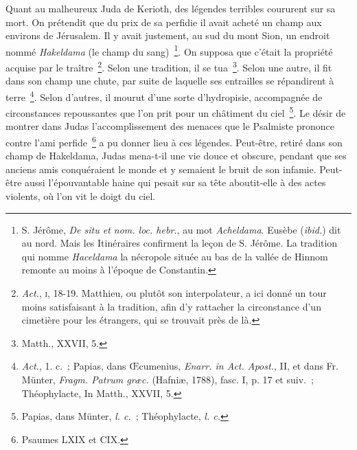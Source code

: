 \documentclass[french,twoside]{book} %
\begin{document}
Quant au malheureux Juda de Kerioth, des légendes terribles coururent sur sa mort. On prétendit que du prix de sa perfidie il avait acheté un champ aux environs de Jérusalem. Il y avait justement, au sud du mont Sion, un endroit nommé {\itshape Hakeldama} (le champ du sang) \footnote{ S. Jérôme, {\itshape De situ et nom. loc. hebr.}, au mot {\itshape Acheldama}. Eusèbe ({\itshape ibid.}) dit au nord. Mais les Itinéraires confirment la leçon de S. Jérôme. La tradition qui nomme {\itshape Haceldama} la nécropole située au bas de la vallée de Hinnom remonte au moins à l’époque de Constantin.}. On supposa que c’était la propriété acquise par le traître \footnote{{\itshape Act.}, \textsc{i}, 18-19. Matthieu, ou plutôt son interpolateur, a ici donné un tour moins satisfaisant à la tradition, afin d’y rattacher la circonstance d’un cimetière pour les étrangers, qui se trouvait près de là.}. Selon une tradition, il se tua \footnote{Matth., XXVII, 5.}. Selon une autre, il fit dans son champ une chute, par suite de laquelle ses entrailles se répandirent à terre \footnote{{\itshape Act.}, 1. c. ; Papias, dans Œcumenius, {\itshape Enarr. in Act. Apost.}, II, et dans Fr. Münter, {\itshape Fragm. Patrum græc.} (Hafniæ, 1788), fasc. I, p. 17 et suiv. ; Théophylacte, In Matth., XXVII, 5.}. Selon d’autres, il mourut d’une sorte d’hydropisie, accompagnée de circonstances repoussantes que l’on prit pour un châtiment du ciel \footnote{ Papias, dans Münter, {\itshape l. c.} ; Théophylacte, {\itshape l. c.}}. Le désir de montrer dans Judas l’accomplissement des menaces que le Psalmiste prononce contre l’ami perfide \footnote{Psaumes LXIX et CIX.} a pu donner lieu à ces légendes. Peut-être, retiré dans son champ de Hakeldama, Judas mena-t-il une vie douce et obscure, pendant que ses anciens amis conquéraient le monde et y semaient le bruit de son infamie. Peut-être aussi l’épouvantable haine qui pesait sur sa tête aboutit-elle à des actes violents, où l’on vit le doigt du ciel.\par
\end{document}
